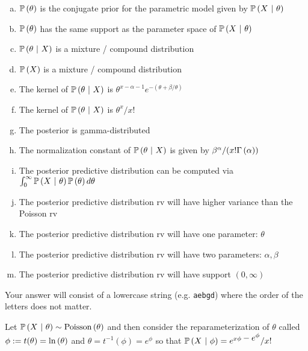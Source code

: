 \documentclass[12pt,landscape]{article}
\newcommand{\instr}{\small Your answer will consist of a lowercase string (e.g. \texttt{aebgd}) where the order of the letters does not matter. \normalsize}
\begin{document}
\begin{enumerate}[(a)]
\item $\mathbb{P}\left(\theta\right)$ is the conjugate prior for the parametric model given by $\mathbb{P}\left(X~|~\theta\right)$
\item $\mathbb{P}\left(\theta\right)$ has the same support as the parameter space of $\mathbb{P}\left(X~|~\theta\right)$
\item $\mathbb{P}\left(\theta~|~X\right)$ is a mixture / compound distribution
\item $\mathbb{P}\left(X\right)$ is a mixture / compound distribution
\item The kernel of $\mathbb{P}\left(\theta~|~X\right)$ is $\theta^{x - \alpha - 1} e^{-(\theta + \beta / \theta)}$
\item The kernel of $\mathbb{P}\left(\theta~|~X\right)$ is $\theta^x / x!$
\item The posterior is gamma-distributed
\item The normalization constant of $\mathbb{P}\left(\theta~|~X\right)$ is given by $\beta^\alpha / (x! \Gamma\left(\alpha\right))$
\item The posterior predictive distribution can be computed via $\int_0^\infty \mathbb{P}\left(X~|~\theta\right) \mathbb{P}\left(\theta\right) d\theta$
\item The posterior predictive distribution rv will have higher variance than the Poisson rv
\item The posterior predictive distribution rv will have one parameter: $\theta$
\item The posterior predictive distribution rv will have two parameters: $\alpha, \beta$
\item The posterior predictive distribution rv will have support $(0, \infty)$
\end{enumerate}
\eenum\instr\pagebreak



\problem{} Let $\mathbb{P}\left(X~|~\theta\right) \sim \mathrm{Poisson}\left(\theta\right)$ and then consider the reparameterization of $\theta$ called $\phi := t(\theta) = \ln\left(\theta\right)$ and $\theta = t^{-1}(\phi) = e^\phi$ so that $\mathbb{P}\left(X~|~\phi\right) = e^{x \phi \displaystyle-e^\phi} / x!$


\vspace{-0.2cm}\benum{} 
\end{document}
